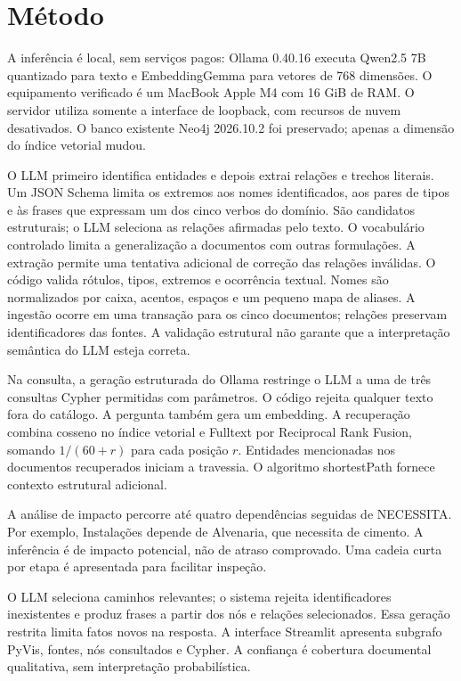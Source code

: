 \documentclass[conference]{IEEEtran}
\begin{document}
\section{Método}
A inferência é local, sem serviços pagos: Ollama 0.40.16 executa Qwen2.5 7B quantizado para texto e EmbeddingGemma para vetores de 768 dimensões. O equipamento verificado é um MacBook Apple M4 com 16 GiB de RAM. O servidor utiliza somente a interface de loopback, com recursos de nuvem desativados. O banco existente Neo4j 2026.10.2 foi preservado; apenas a dimensão do índice vetorial mudou.

O LLM primeiro identifica entidades e depois extrai relações e trechos literais. Um JSON Schema limita os extremos aos nomes identificados, aos pares de tipos e às frases que expressam um dos cinco verbos do domínio. São candidatos estruturais; o LLM seleciona as relações afirmadas pelo texto. O vocabulário controlado limita a generalização a documentos com outras formulações. A extração permite uma tentativa adicional de correção das relações inválidas. O código valida rótulos, tipos, extremos e ocorrência textual. Nomes são normalizados por caixa, acentos, espaços e um pequeno mapa de aliases. A ingestão ocorre em uma transação para os cinco documentos; relações preservam identificadores das fontes. A validação estrutural não garante que a interpretação semântica do LLM esteja correta.

Na consulta, a geração estruturada do Ollama restringe o LLM a uma de três consultas Cypher permitidas com parâmetros. O código rejeita qualquer texto fora do catálogo. A pergunta também gera um embedding. A recuperação combina cosseno no índice vetorial e Fulltext por Reciprocal Rank Fusion, somando $1/(60+r)$ para cada posição $r$. Entidades mencionadas nos documentos recuperados iniciam a travessia. O algoritmo shortestPath fornece contexto estrutural adicional.

A análise de impacto percorre até quatro dependências seguidas de NECESSITA. Por exemplo, Instalações depende de Alvenaria, que necessita de cimento. A inferência é de impacto potencial, não de atraso comprovado. Uma cadeia curta por etapa é apresentada para facilitar inspeção.

O LLM seleciona caminhos relevantes; o sistema rejeita identificadores inexistentes e produz frases a partir dos nós e relações selecionados. Essa geração restrita limita fatos novos na resposta. A interface Streamlit apresenta subgrafo PyVis, fontes, nós consultados e Cypher. A confiança é cobertura documental qualitativa, sem interpretação probabilística.
\end{document}

